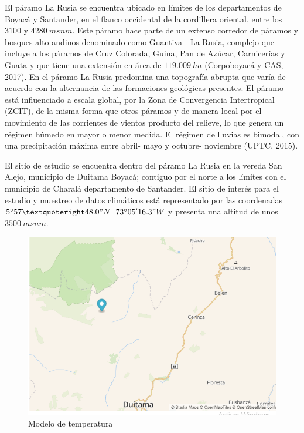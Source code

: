 \documentclass[conference,final,]{IEEEtran}
\makeatletter
\def\maxwidth{\ifdim\Gin@nat@width>\linewidth\linewidth
\else\Gin@nat@width\fi}
\let\Oldincludegraphics\includegraphics
\renewcommand{\includegraphics}[1]{\Oldincludegraphics[width=\maxwidth]{#1}}
\makeatother
\begin{document}
El páramo La Rusia se encuentra ubicado en límites de los departamentos
de Boyacá y Santander, en el flanco occidental de la cordillera
oriental, entre los \(3100\) y \(4280 \ msnm\). Este páramo hace parte
de un extenso corredor de páramos y bosques alto andinos denominado como
Guantiva - La Rusia, complejo que incluye a los páramos de Cruz
Colorada, Guina, Pan de Azúcar, Carnicerías y Guata y que tiene una
extensión en área de \(119.009 \ ha\) (Corpoboyacá y CAS, 2017). En el
páramo La Rusia predomina una topografía abrupta que varía de acuerdo
con la alternancia de las formaciones geológicas presentes. El páramo
está influenciado a escala global, por la Zona de Convergencia
Intertropical (ZCIT), de la misma forma que otros páramos y de manera
local por el movimiento de las corrientes de vientos producto del
relieve, lo que genera un régimen húmedo en mayor o menor medida. El
régimen de lluvias es bimodal, con una precipitación máxima entre abril-
mayo y octubre- noviembre (UPTC, 2015).

El sitio de estudio se encuentra dentro del páramo La Rusia en la vereda
San Alejo, municipio de Duitama Boyacá; contiguo por el norte a los
límites con el municipio de Charalá departamento de Santander. El sitio
de interés para el estudio y muestreo de datos climáticos está
representado por las coordenadas \(5^{\circ}57’48.0"N\)
\(73^{\circ}05'16.3"W\) y presenta una altitud de unos \(3500\ msnm\).

\begin{figure}
\centering
\includegraphics{mapaloc.png}
\caption{Modelo de temperatura}
\end{figure}
\end{document}
